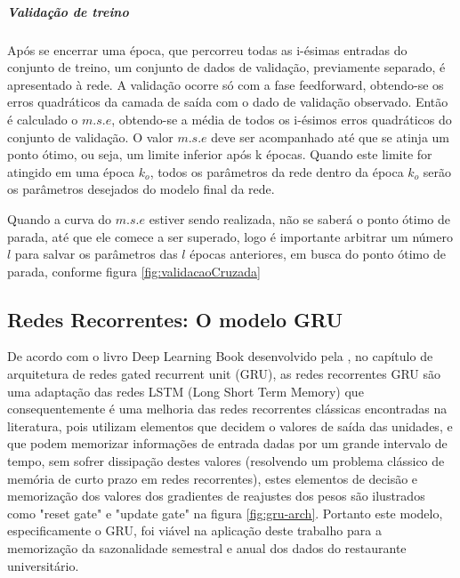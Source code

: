             \subparagraph{Validação de treino}
                Após se encerrar uma época, que percorreu todas as i-ésimas entradas do conjunto de treino, um conjunto de dados de validação, previamente separado, é apresentado à rede.
                A validação ocorre só com a fase feedforward, obtendo-se os erros quadráticos da camada de saída com o dado de validação observado.
                Então é calculado o $m.s.e$, obtendo-se a média de todos os i-ésimos erros quadráticos do conjunto de validação.
                O valor $m.s.e$ deve ser acompanhado até que se atinja um ponto ótimo, ou seja, um limite inferior após k épocas.
                Quando este limite for atingido em uma época $k_o$, todos os parâmetros da rede dentro da época $k_o$ serão os parâmetros desejados do modelo final da rede.
                
                Quando a curva do $m.s.e$ estiver sendo realizada, não se saberá o ponto ótimo de parada, até que ele comece a ser superado, logo é importante arbitrar um número $l$ para salvar os parâmetros das $l$ épocas anteriores, em busca do ponto ótimo de parada, conforme figura \ref{fig:validacaoCruzada}
        
        \subsection{Redes Recorrentes: O modelo GRU}
         	De acordo com  o livro Deep Learning Book desenvolvido pela  \cite{DLB}, no capítulo de arquitetura de redes gated recurrent unit (GRU), as redes recorrentes GRU são uma adaptação das redes LSTM (Long Short Term Memory) que consequentemente é uma melhoria das redes recorrentes clássicas encontradas na literatura, pois utilizam elementos que decidem o valores de saída das unidades, e que podem memorizar informações de entrada dadas por um grande intervalo de tempo, sem sofrer dissipação destes valores (resolvendo um problema clássico de memória de curto prazo em redes recorrentes), estes elementos de decisão e memorização dos valores dos gradientes de reajustes dos pesos são ilustrados como "reset gate" e "update gate" na figura \ref{fig:gru-arch}. Portanto este modelo, especificamente o GRU, foi viável na aplicação deste trabalho para a memorização da sazonalidade semestral e anual dos dados do restaurante universitário.
         	
            \begin{figure}[H]
            \end{figure}